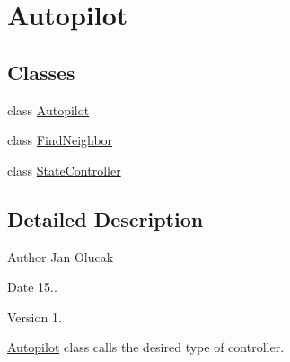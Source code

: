 \hypertarget{group___autopilot}{}\section{Autopilot}
\label{group___autopilot}
\subsection*{Classes}
\begin{DoxyCompactItemize}
\item 
class \hyperlink{class_autopilot}{Autopilot}
\item 
class \hyperlink{class_find_neighbor}{Find\+Neighbor}
\item 
class \hyperlink{class_state_controller}{State\+Controller}
\end{DoxyCompactItemize}


\subsection{Detailed Description}
\begin{DoxyAuthor}{Author}
Jan Olucak 
\end{DoxyAuthor}
\begin{DoxyDate}{Date}
15.. 
\end{DoxyDate}
\begin{DoxyVersion}{Version}
1.
\end{DoxyVersion}
\hyperlink{class_autopilot}{Autopilot} class calls the desired type of controller. 